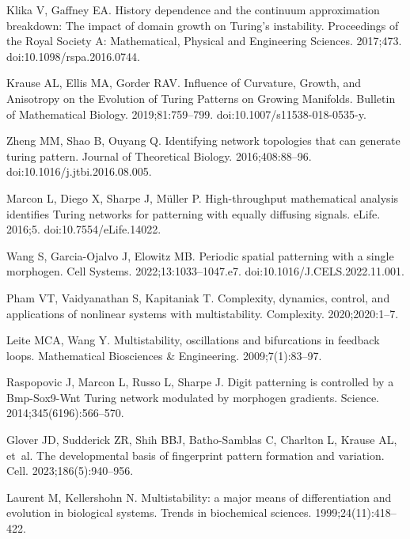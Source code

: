 \documentclass[10pt,letterpaper]{article}
\begin{document}
\begin{thebibliography}{10}
	Klika V, Gaffney EA.
	\newblock History dependence and the continuum approximation breakdown: The
	impact of domain growth on Turing's instability.
	\newblock Proceedings of the Royal Society A: Mathematical, Physical and
	Engineering Sciences. 2017;473.
	\newblock doi:{10.1098/rspa.2016.0744}.
	
	Krause AL, Ellis MA, Gorder RAV.
	\newblock Influence of Curvature, Growth, and Anisotropy on the Evolution of
	Turing Patterns on Growing Manifolds.
	\newblock Bulletin of Mathematical Biology. 2019;81:759--799.
	\newblock doi:{10.1007/s11538-018-0535-y}.
	
	Zheng MM, Shao B, Ouyang Q.
	\newblock Identifying network topologies that can generate turing pattern.
	\newblock Journal of Theoretical Biology. 2016;408:88--96.
	\newblock doi:{10.1016/j.jtbi.2016.08.005}.
	
	Marcon L, Diego X, Sharpe J, Müller P.
	\newblock High-throughput mathematical analysis identifies Turing networks for
	patterning with equally diffusing signals.
	\newblock eLife. 2016;5.
	\newblock doi:{10.7554/eLife.14022}.
	
	Wang S, Garcia-Ojalvo J, Elowitz MB.
	\newblock Periodic spatial patterning with a single morphogen.
	\newblock Cell Systems. 2022;13:1033--1047.e7.
	\newblock doi:{10.1016/J.CELS.2022.11.001}.
	
	Pham VT, Vaidyanathan S, Kapitaniak T.
	\newblock Complexity, dynamics, control, and applications of nonlinear systems
	with multistability.
	\newblock Complexity. 2020;2020:1--7.
	
	Leite MCA, Wang Y.
	\newblock Multistability, oscillations and bifurcations in feedback loops.
	\newblock Mathematical Biosciences \& Engineering. 2009;7(1):83--97.
	
	Raspopovic J, Marcon L, Russo L, Sharpe J.
	\newblock Digit patterning is controlled by a Bmp-Sox9-Wnt Turing network
	modulated by morphogen gradients.
	\newblock Science. 2014;345(6196):566--570.
	
	Glover JD, Sudderick ZR, Shih BBJ, Batho-Samblas C, Charlton L, Krause AL,
	et~al.
	\newblock The developmental basis of fingerprint pattern formation and
	variation.
	\newblock Cell. 2023;186(5):940--956.
	
	Laurent M, Kellershohn N.
	\newblock Multistability: a major means of differentiation and evolution in
	biological systems.
	\newblock Trends in biochemical sciences. 1999;24(11):418--422.
	

\end{thebibliography}
\end{document}
